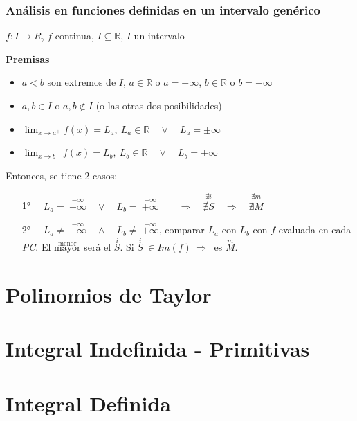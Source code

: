 \documentclass[11pt,titlepage]{article}
\newcommand{\commLim}[2]{\lim_{#1 \to #2}}
\newcommand{\littleTitle}[1]{
	\noindent \ignorespaces
	\small \textbf{#1} \normalsize
	\ignorespaces \ignorespacesafterend
}
\begin{document}
\subsubsection{Análisis en funciones definidas en un intervalo genérico}
\begin{center}
	$f: I \to R$, $f$ continua, $I \subseteq \mathbb{R}$, $I$ un intervalo
\end{center} \par
\littleTitle{Premisas} \par
\begin{itemize}
	\item $a < b$ son extremos de $I$, $a \in \mathbb{R}$ o $a = -\infty$, $b \in \mathbb{R}$ o $b = +\infty$
	\item $a,b \in I$ o $a,b \notin I$ (o las otras dos posibilidades)
	\item $\commLim{x}{a^+} f(x) = L_a, \ L_a \in \mathbb{R} \quad \lor \quad L_a = \pm \infty$
	\item $\commLim{x}{b^-} f(x) = L_b, \ L_b \in \mathbb{R} \quad \lor \quad L_b = \pm \infty$
\end{itemize}
Entonces, se tiene 2 casos:
\begin{itemize}
	\item[1°] $\quad L_a = \ \stackrel{-\infty}{+\infty} \quad \lor \quad L_b = \ \stackrel{-\infty}{+\infty} \qquad \Rightarrow \quad \stackrel{\nexists i}{\nexists S} \quad \Rightarrow \quad \stackrel{\nexists m}{\nexists M}$
	\item[2°] $\quad L_a \neq \ \stackrel{-\infty}{+\infty} \quad \land \quad L_b \neq \ \stackrel{-\infty}{+\infty}$, comparar $L_a$ con $L_b$ con $f$ evaluada en cada \emph{PC}. El $\stackrel{\text{menor}}{\text{mayor}}$ será el $\stackrel{i}{S}$. Si $\stackrel{i}{S} \ \in Im(f) \ \Rightarrow \ $ es $\stackrel{m}{M}$. 
\end{itemize}

\vspace{1cm}
\section{Polinomios de Taylor}


\vspace{1cm}
\section{Integral Indefinida - Primitivas}


\vspace{1cm}
\section{Integral Definida}
\end{document}
